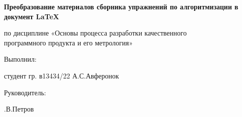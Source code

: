 \documentclass[12pt]{article}
\begin{document}
\begin{titlepage}
\vspace{\baselineskip}
\begin{Center}
{\fontsize{14pt}{16.8pt}\selectfont \textbf{Преобразование материалов сборника упражнений по алгоритмизации в документ LaTeX}\par}
\end{Center}\par

\begin{Center}
{\fontsize{14pt}{16.8pt}\selectfont по дисциплине «Основы процесса разработки качественного \\программного продукта и его метрология»\par}
\end{Center}\par


\vspace{\baselineskip}

\vspace{\baselineskip}

\vspace{\baselineskip}

\vspace{\baselineskip}

\vspace{\baselineskip}


\begin{adjustwidth}{0.39in}{0.0in}
{\fontsize{14pt}{16.8pt}\selectfont Выполнил:\par}\par

\end{adjustwidth}

\begin{adjustwidth}{0.39in}{0.0in}
{\fontsize{14pt}{16.8pt}\selectfont студент гр. в13434/22 \tabto{2.75in}  \tabto{5in} А.С.Авферонок\\[0.5mm]\par}\par

\end{adjustwidth}

\begin{adjustwidth}{0.39in}{0.0in}
{\fontsize{14pt}{16.8pt}\selectfont Руководитель:\par}\par

\end{adjustwidth}

\begin{adjustwidth}{0.39in}{0.0in}
{\fontsize{14pt}{16.8pt}  \tabto{5in} .В.Петров\par}\par


\end{adjustwidth}
\end{titlepage}
\end{document}
